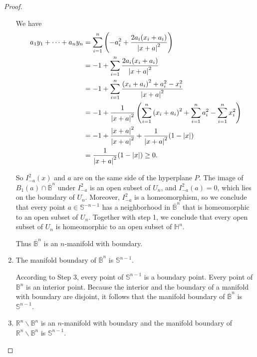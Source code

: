 \begin{proof}
\begin{enumerate}[label={\textbf{Step \arabic*.}},itemindent=1cm]
		      We have
		      \begingroup
		      \allowdisplaybreaks{}
		      \begin{align*}
			      a_{1}y_{1} + \cdots + a_{n}y_{n} & = \sum^{n}_{i=1}\left(-a_{i}^{2} + \frac{2a_{i}(x_{i} + a_{i})}{\left\vert{x + a}\right\vert^{2}}\right)                                                \\
			                                       & = -1 + \sum^{n}_{i=1}\frac{2a_{i}(x_{i} + a_{i})}{\left\vert{x + a}\right\vert^{2}}                                                                     \\
			                                       & = -1 + \sum^{n}_{i=1}\frac{{(x_{i} + a_{i})}^{2} + a_{i}^{2} - x_{i}^{2}}{\left\vert{x + a}\right\vert^{2}}                                             \\
			                                       & = -1 + \frac{1}{\left\vert{x + a}\right\vert^{2}}\left( \sum^{n}_{i=1}{(x_{i} + a_{i})}^{2} + \sum^{n}_{i=1}a_{i}^{2} - \sum^{n}_{i=1}x_{i}^{2} \right) \\
			                                       & = -1 + \frac{\left\vert{x+a}\right\vert^{2}}{\left\vert{x+a}\right\vert^{2}} + \frac{1}{\left\vert{x+a}\right\vert^{2}}(1 - \left\vert{x}\right\vert)                                                      \\
			                                       & = \frac{1}{\left\vert{x+a}\right\vert^{2}}(1 - \left\vert{x}\right\vert) \geq 0.
		      \end{align*}
		      \endgroup

		      So $I^{2}_{-a}(x)$ and $a$ are on the same side of the hyperplane $P$. The image of $B_{1}(a)\cap \overline{\mathbb{B}}^{n}$ under $I^{2}_{-a}$ is an open subset of $U_{n}$, and $I^{2}_{-a}(a) = 0$, which lies on the boundary of $U_{n}$. Moreover, $I^{2}_{-a}$ is a homeomorphism, so we conclude that every point $a\in\mathbb{S}^{-n-1}$ has a neighborhood in $\overline{\mathbb{B}}^{n}$ that is homeomorphic to an open subset of $U_{n}$. Together with step 1, we conclude that every open subset of $U_{n}$ is homeomorphic to an open subset of $\mathbb{H}^{n}$.

		      Thus $\overline{\mathbb{B}}^{n}$ is an $n$-manifold with boundary.
		\item The manifold boundary of $\overline{\mathbb{B}}^{n}$ is $\mathbb{S}^{n-1}$.

		      According to Step 3, every point of $\mathbb{S}^{n-1}$ is a boundary point. Every point of $\mathbb{B}^{n}$ is an interior point. Because the interior and the boundary of a manifold with boundary are disjoint, it follows that the manifold boundary of $\overline{\mathbb{B}}^{n}$ is $\mathbb{S}^{n-1}$.
		\item $\mathbb{R}^{n}\smallsetminus \mathbb{B}^{n}$ is an $n$-manifold with boundary and the manifold boundary of $\mathbb{R}^{n}\smallsetminus \mathbb{B}^{n}$ is $\mathbb{S}^{n-1}$.


\end{enumerate}
\end{proof}
